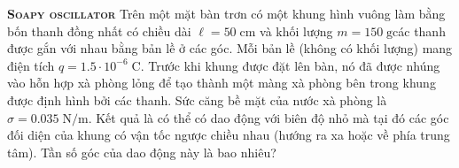 
\begin{problem}
	{\textbf{\textsc{Soapy oscillator}}} Trên một mặt bàn trơn có một khung hình vuông làm bằng bốn thanh đồng nhất có chiều dài $\ell=50\;\mathrm{cm}$ và khối lượng $m=150\;\mathrm{g}$các thanh được gắn với nhau bằng bản lề ở các góc. Mỗi bản lề (không có khối lượng) mang điện tích $q=1.5\cdot10^{-6}\;\mathrm{C}$. Trước khi khung được đặt lên bàn, nó đã được nhúng vào hỗn hợp xà phòng lỏng để tạo thành một màng xà phòng bên trong khung được định hình bởi các thanh. Sức căng bề mặt của nước xà phòng là $\sigma=0.035\;\mathrm{N/m}$. Kết quả là có thể có dao động với biên độ nhỏ mà tại đó các góc đối diện của khung có vận tốc ngược chiều nhau (hướng ra xa hoặc về phía trung tâm). Tần số góc của dao động này là bao nhiêu?
\end{problem}